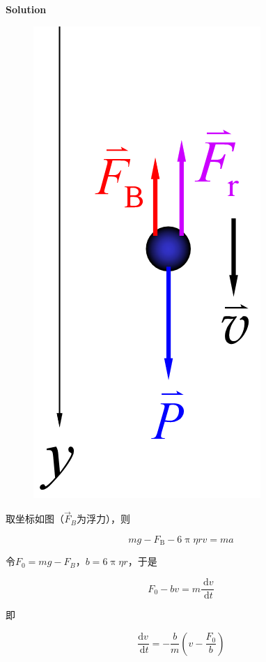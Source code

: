 \documentclass[
	12pt, %
	a4paper, %
]{myLegrandOrangeBook}
\begin{document}
    \textbf{Solution}
    \vspace{1em}

    \begin{figure}
        \centering
        \includegraphics[scale=0.3]{"Chapter 02 images/pic2.png"}
        \label{pic2}
    \end{figure}

    取坐标如图（\(\overrightarrow{F}_{B}\)为浮力），则

    $$
        m g-F_{\mathrm{B}}-6 \uppi \eta r v=m a
    $$

    令\(F_{0} = mg - F_{B}\)，\(b = 6 \uppi \eta r\)，于是

    $$
        F_0-b v=m \frac{\mathrm{~d} v}{\mathrm{~d} t}
    $$

    即

    $$
        \frac{\mathrm{d} v}{\mathrm{~d} t}=-\frac{b}{m}\left(v-\frac{F_0}{b}\right)
    $$
\end{document}
